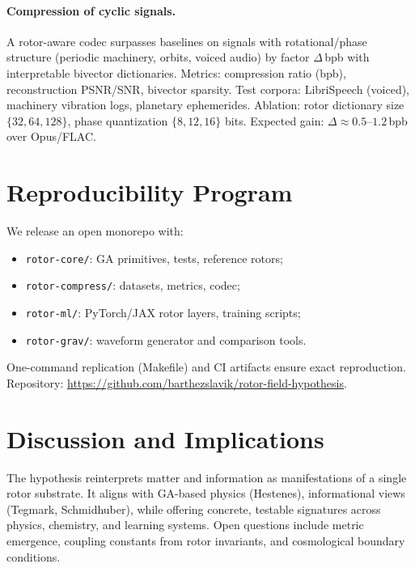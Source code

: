 \documentclass[11pt,a4paper]{article}
\theoremstyle{definition}
\theoremstyle{plain}
\theoremstyle{remark}
\begin{document}
\paragraph{Compression of cyclic signals.}
A rotor-aware codec surpasses baselines on signals with rotational/phase structure (periodic machinery, orbits, voiced audio) by factor $\Delta$\,bpb with interpretable bivector dictionaries. Metrics: compression ratio (bpb), reconstruction PSNR/SNR, bivector sparsity. Test corpora: LibriSpeech (voiced), machinery vibration logs, planetary ephemerides. Ablation: rotor dictionary size $\{32, 64, 128\}$, phase quantization $\{8, 12, 16\}$ bits. Expected gain: $\Delta \approx 0.5$--$1.2$\,bpb over Opus/FLAC.

\vspace{1em}

\section{Reproducibility Program}
We release an open monorepo with:
\begin{itemize}[leftmargin=*,itemsep=2pt]
  \item \texttt{rotor-core/}: GA primitives, tests, reference rotors;
  \item \texttt{rotor-compress/}: datasets, metrics, codec;
  \item \texttt{rotor-ml/}: PyTorch/JAX rotor layers, training scripts;
  \item \texttt{rotor-grav/}: waveform generator and comparison tools.
\end{itemize}
One-command replication (Makefile) and CI artifacts ensure exact reproduction. Repository: \url{https://github.com/barthezslavik/rotor-field-hypothesis}.

\vspace{1em}

\section{Discussion and Implications}
The hypothesis reinterprets matter and information as manifestations of a single rotor substrate. It aligns with GA-based physics (Hestenes), informational views (Tegmark, Schmidhuber), while offering concrete, testable signatures across physics, chemistry, and learning systems. Open questions include metric emergence, coupling constants from rotor invariants, and cosmological boundary conditions.

\vspace{1em}
\end{document}
